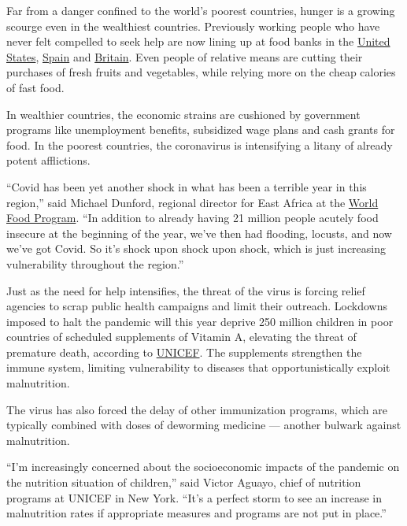 Far from a danger confined to the world's poorest countries, hunger is a
growing scourge even in the wealthiest countries. Previously working
people who have never felt compelled to seek help are now lining up at
food banks in the
\href{https://www.nytimes3xbfgragh.onion/interactive/2020/09/02/magazine/food-insecurity-hunger-us.html}{United
States},
\href{https://www.independent.co.uk/news/world/europe/food-banks-spain-hunger-coronavirus-poverty-covid-19-a9536341.html}{Spain}
and
\href{https://www.nytimes3xbfgragh.onion/2020/03/19/world/europe/coronavirus-uk-food-banks.html}{Britain}.
Even people of relative means are cutting their purchases of fresh
fruits and vegetables, while relying more on the cheap calories of fast
food.

In wealthier countries, the economic strains are cushioned by government
programs like unemployment benefits, subsidized wage plans and cash
grants for food. In the poorest countries, the coronavirus is
intensifying a litany of already potent afflictions.

``Covid has been yet another shock in what has been a terrible year in
this region,'' said Michael Dunford, regional director for East Africa
at the \href{https://www.wfp.org/}{World Food Program}. ``In addition to
already having 21 million people acutely food insecure at the beginning
of the year, we've then had flooding, locusts, and now we've got Covid.
So it's shock upon shock upon shock, which is just increasing
vulnerability throughout the region.''

Just as the need for help intensifies, the threat of the virus is
forcing relief agencies to scrap public health campaigns and limit their
outreach. Lockdowns imposed to halt the pandemic will this year deprive
250 million children in poor countries of scheduled supplements of
Vitamin A, elevating the threat of premature death, according to
\href{https://www.unicefusa.org/mission/starts-with-u/protection-for-children?}{UNICEF}.
The supplements strengthen the immune system, limiting vulnerability to
diseases that opportunistically exploit malnutrition.

The virus has also forced the delay of other immunization programs,
which are typically combined with doses of deworming medicine ---
another bulwark against malnutrition.

``I'm increasingly concerned about the socioeconomic impacts of the
pandemic on the nutrition situation of children,'' said Victor Aguayo,
chief of nutrition programs at UNICEF in New York. ``It's a perfect
storm to see an increase in malnutrition rates if appropriate measures
and programs are not put in place.''

